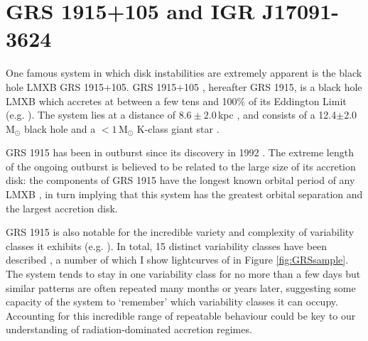 \section{GRS 1915+105 and IGR J17091-3624}

\label{sec:1915}

\par One famous system in which disk instabilities are extremely apparent is the black hole LMXB GRS 1915+105.  GRS 1915+105 \citep{CastroTirado_GRS1915}, hereafter GRS 1915, is a black hole LMXB which accretes at between a few tens and 100\% of its Eddington Limit (e.g. \citealp{Vilhu_SupEd,Done_GRS_HighAcc,Fender_DiskJet}).  The system lies at a distance of $8.6\pm2.0$\,kpc \citep{Reid_Parallax}, and consists of a 12.4$\pm$2.0\,M$_\odot$ black hole and a $<1$\,M$_\odot$ K-class giant star \citep{Reid_Parallax,Ziolkowski_GRSDonor}.
\par GRS 1915 has been in outburst since its discovery in 1992 \citep{CastroTirado_GRS1915}.  The extreme length of the ongoing outburst is believed to be related to the large size of its accretion disk: the components of GRS 1915 have the longest known orbital period of any LMXB \citep{Greiner_BigDisk}, in turn implying that this system has the greatest orbital separation and the largest accretion disk.
\par GRS 1915 is also notable for the incredible variety and complexity of variability classes it exhibits (e.g. \citealp{Yadav_GRSBursts,Belloni_GRS_MI}).  In total, 15 distinct variability classes have been described \citep{Belloni_GRS_MI,KleinWolt_OmegaClass,Hannikainen_NewClass, Pahari_NewClass}, a number of which I show lightcurves of in Figure \ref{fig:GRSsample}.  The system tends to stay in one variability class for no more than a few days but similar patterns are often repeated many months or years later, suggesting some capacity of the system to `remember' which variability classes it can occupy.  Accounting for this incredible range of repeatable behaviour could be key to our understanding of radiation-dominated accretion regimes.

